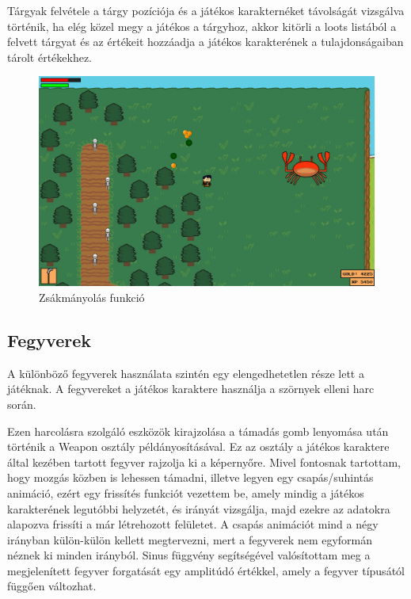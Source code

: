 Tárgyak felvétele a tárgy pozíciója és a játékos karakternéket távolságát vizsgálva történik, ha elég közel megy a játékos a tárgyhoz, akkor kitörli a loots listából a felvett tárgyat és az értékeit hozzáadja a játékos karakterének a tulajdonságaiban tárolt értékekhez.

\begin{figure}[H]
    \centering
    \includegraphics[width=15.5truecm]{images/loots.png}
    \caption{Zsákmányolás funkció \cite{loot-sys}}
    \label{fig:Zsákmányolás funkció}
\end{figure}


\subsection{Fegyverek}

\indent \indent A különböző fegyverek használata szintén egy elengedhetetlen része lett a játéknak. A fegyvereket a játékos karaktere használja a szörnyek elleni harc során. 

Ezen harcolásra szolgáló eszközök kirajzolása a támadás gomb lenyomása után történik a Weapon osztály példányosításával. Ez az osztály a játékos karaktere által kezében tartott fegyver rajzolja ki a képernyőre. Mivel fontosnak tartottam, hogy mozgás közben is lehessen támadni, illetve legyen egy csapás/suhintás animáció, ezért egy frissítés funkciót vezettem be, amely mindig a játékos karakterének legutóbbi helyzetét, és irányát vizsgálja, majd ezekre az adatokra alapozva frissíti a már létrehozott felületet. A csapás animációt mind a négy irányban külön-külön kellett megtervezni, mert a fegyverek nem egyformán néznek ki minden irányból. Sinus függvény segítségével valósítottam meg a megjelenített fegyver forgatását egy amplitúdó értékkel, amely a fegyver típusától függően változhat.

